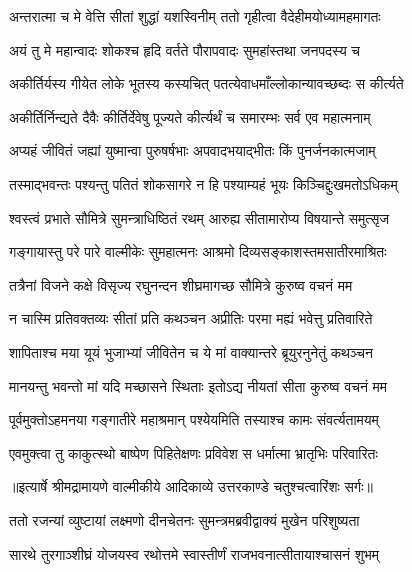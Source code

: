 \twolineshloka
{अन्तरात्मा च मे वेत्ति सीतां शुद्धां यशस्विनीम्}
{ततो गृहीत्वा वैदेहीमयोध्यामहमागतः} %

\twolineshloka
{अयं तु मे महान्वादः शोकश्च हृदि वर्तते}
{पौरापवादः सुमहांस्तथा जनपदस्य च} %

\twolineshloka
{अकीर्तिर्यस्य गीयेत लोके भूतस्य कस्यचित्}
{पतत्येवाधमाँल्लोकान्यावच्छब्दः स कीर्त्यते} %

\twolineshloka
{अकीर्तिर्निन्द्यते दैवैः कीर्तिर्देवेषु पूज्यते}
{कीर्त्यर्थं च समारम्भः सर्व एव महात्मनाम्} %

\twolineshloka
{अप्यहं जीवितं जह्यां युष्मान्वा पुरुषर्षभाः}
{अपवादभयाद्भीतः किं पुनर्जनकात्मजाम्} %

\twolineshloka
{तस्माद्भवन्तः पश्यन्तु पतितं शोकसागरे}
{न हि पश्याम्यहं भूयः किञ्चिद्दुःखमतोऽधिकम्} %

\twolineshloka
{श्वस्त्वं प्रभाते सौमित्रे सुमन्त्राधिष्ठितं रथम्}
{आरुह्य सीतामारोप्य विषयान्ते समुत्सृज} %

\twolineshloka
{गङ्गायास्तु परे पारे वाल्मीकेः सुमहात्मनः}
{आश्रमो दिव्यसङ्काशस्तमसातीरमाश्रितः} %

\twolineshloka
{तत्रैनां विजने कक्षे विसृज्य रघुनन्दन}
{शीघ्रमागच्छ सौमित्रे कुरुष्व वचनं मम} %

\twolineshloka
{न चास्मि प्रतिवक्तव्यः सीतां प्रति कथञ्चन}
{अप्रीतिः परमा मह्यं भवेत्तु प्रतिवारिते} %

\twolineshloka
{शापिताश्च मया यूयं भुजाभ्यां जीवितेन च}
{ये मां वाक्यान्तरे ब्रूयुरनुनेतुं कथञ्चन} %

\twolineshloka
{मानयन्तु भवन्तो मां यदि मच्छासने स्थिताः}
{इतोऽद्य नीयतां सीता कुरुष्व वचनं मम} %

\twolineshloka
{पूर्वमुक्तोऽहमनया गङ्गातीरे महाश्रमान्}
{पश्येयमिति तस्याश्च कामः संवर्त्यतामयम्} %

\twolineshloka
{एवमुक्त्वा तु काकुत्स्थो बाष्पेण पिहितेक्षणः}
{प्रविवेश स धर्मात्मा भ्रातृभिः परिवारितः} %


{॥इत्यार्षे श्रीमद्रामायणे वाल्मीकीये आदिकाव्ये उत्तरकाण्डे चतुश्चत्वारिंशः सर्गः॥}


\twolineshloka
{ततो रजन्यां व्युष्टायां लक्ष्मणो दीनचेतनः}
{सुमन्त्रमब्रवीद्वाक्यं मुखेन परिशुष्यता} %

\twolineshloka
{सारथे तुरगाञ्शीघ्रं योजयस्व रथोत्तमे}
{स्वास्तीर्णं राजभवनात्सीतायाश्चासनं शुभम्} %

